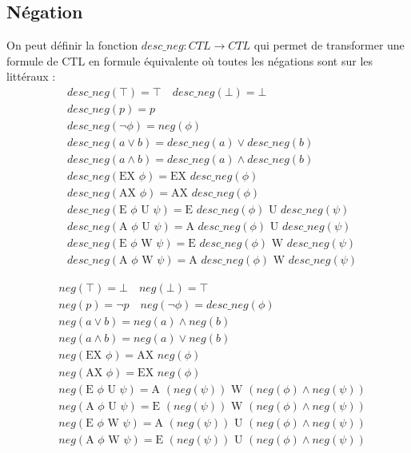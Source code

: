 \documentclass[10pt,a4paper]{article}
\begin{document}
\subsection{Négation}
On peut définir la fonction $desc\_neg:CTL \to CTL$ qui permet de transformer une formule de CTL en formule équivalente où toutes les négations sont sur les littéraux :
\begin{align*}
&desc\_neg(\top) = \top \quad desc\_neg(\bot) = \bot\\
&desc\_neg(p) = p \\
&desc\_neg(\neg \phi) = neg(\phi)\\
&desc\_neg(a \lor b) = desc\_neg(a) \lor desc\_neg(b)\\
&desc\_neg(a \land b) = desc\_neg(a) \land desc\_neg(b)\\
&desc\_neg(\mbox{EX } \phi) = \mbox{EX }desc\_neg(\phi)\\
&desc\_neg(\mbox{AX } \phi) = \mbox{AX }desc\_neg(\phi)\\
&desc\_neg(\mbox{E } \phi \mbox{ U } \psi) =\mbox{E } desc\_neg(\phi) \mbox{ U } desc\_neg(\psi)\\
&desc\_neg(\mbox{A } \phi \mbox{ U } \psi) =\mbox{A }
desc\_neg(\phi) \mbox{ U } desc\_neg(\psi)\\
&desc\_neg(\mbox{E } \phi \mbox{ W } \psi) =\mbox{E } desc\_neg(\phi) \mbox{ W } desc\_neg(\psi)\\
&desc\_neg(\mbox{A } \phi \mbox{ W } \psi) =\mbox{A } desc\_neg(\phi) \mbox{ W } desc\_neg(\psi)
\end{align*}

\begin{align*}
&neg(\top) = \bot \quad neg(\bot) = \top\\
&neg(p) = \neg p \quad neg(\neg \phi) = desc\_neg(\phi)\\
&neg(a \lor b) = neg(a) \land neg(b)\\
&neg(a \land b) = neg(a) \lor neg(b)\\
&neg(\mbox{EX } \phi) = \mbox{AX }neg(\phi)\\
&neg(\mbox{AX } \phi) = \mbox{EX }neg(\phi)\\
&neg(\mbox{E } \phi \mbox{ U } \psi) =\mbox{A } (neg(\psi)) \mbox{ W } (neg(\phi) \land neg(\psi))\\
&neg(\mbox{A } \phi \mbox{ U } \psi) =\mbox{E } (neg(\psi)) \mbox{ W } (neg(\phi) \land neg(\psi))\\
&neg(\mbox{E } \phi \mbox{ W } \psi) =\mbox{A } (neg(\psi)) \mbox{ U } (neg(\phi) \land neg(\psi))\\
&neg(\mbox{A } \phi \mbox{ W } \psi) =\mbox{E } (neg(\psi)) \mbox{ U } (neg(\phi) \land neg(\psi))
\end{align*}
\end{document}
